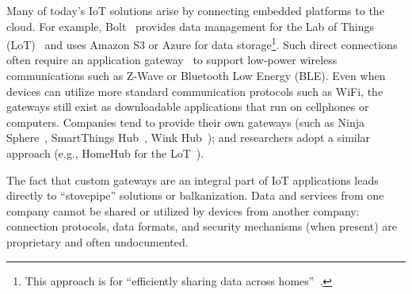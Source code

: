 Many of today's IoT solutions arise by connecting embedded platforms to the
cloud.  For example, Bolt~\cite{gupta2014bolt} provides data management for the
Lab of Things (LoT)~\cite{brush2013lab} and uses Amazon S3 or Azure for data
storage\footnote{This approach is for ``efficiently sharing data across
  homes''~\cite{gupta2014bolt}.}.  Such direct connections often require an
application gateway~\cite{zachariah1001internet} to support low-power wireless
communications such as Z-Wave or Bluetooth Low Energy (BLE).  Even when devices
can utilize more standard communication protocols such as WiFi, the gateways
still exist as downloadable applications that run on cellphones or computers.
Companies tend to provide their own gateways (such as Ninja Sphere~\cite{ninja},
SmartThings Hub~\cite{smartthings}, Wink Hub~\cite{wink}); and researchers adopt
a similar approach (e.g., HomeHub for the LoT~\cite{brush2013lab}).

The fact that custom gateways are an integral part of IoT applications leads
directly to ``stovepipe'' solutions or balkanization. Data and services from one
company cannot be shared or utilized by devices from another company: connection
protocols, data formats, and security mechanisms (when present) are proprietary
and often undocumented.

